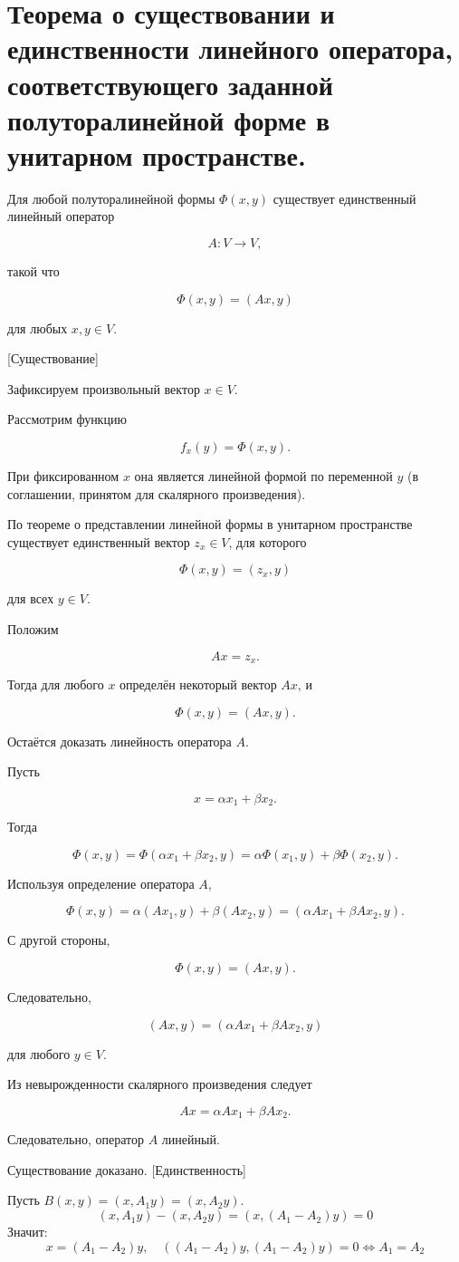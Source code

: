 \documentclass[14pt]{extreport}
\begin{document}
    \chapter{Теорема о существовании и единственности линейного оператора, соответствующего
заданной полуторалинейной форме в унитарном пространстве.}

\begin{thbox}
    Для любой полуторалинейной формы \(\Phi(x,y)\) существует единственный
линейный оператор

\[
A:V\to V,
\]

такой что

\[
\Phi(x,y)=(Ax,y)
\]

для любых \(x,y\in V\).
\end{thbox}
\begin{prbox}
    {[Существование]}

    Зафиксируем произвольный вектор \(x\in V\).

Рассмотрим функцию

\[
f_x(y)=\Phi(x,y).
\]

При фиксированном \(x\) она является линейной формой по переменной \(y\)
(в соглашении, принятом для скалярного произведения).

По теореме о представлении линейной формы в унитарном пространстве
существует единственный вектор \(z_x\in V\), для которого

\[
\Phi(x,y)=(z_x,y)
\]

для всех \(y\in V\).

Положим

\[
Ax=z_x.
\]

Тогда для любого \(x\) определён некоторый вектор \(Ax\), и

\[
\Phi(x,y)=(Ax,y).
\]

Остаётся доказать линейность оператора \(A\).

Пусть

\[
x=\alpha x_1+\beta x_2.
\]

Тогда

\[
\Phi(x,y)
=
\Phi(\alpha x_1+\beta x_2,y)
=
\alpha\Phi(x_1,y)+\beta\Phi(x_2,y).
\]

Используя определение оператора \(A\),

\[
\Phi(x,y)
=
\alpha(Ax_1,y)+\beta(Ax_2,y)
=
(\alpha Ax_1+\beta Ax_2,y).
\]

С другой стороны,

\[
\Phi(x,y)=(Ax,y).
\]

Следовательно,

\[
(Ax,y)
=
(\alpha Ax_1+\beta Ax_2,y)
\]

для любого \(y\in V\).

Из невырожденности скалярного произведения следует

\[
Ax=\alpha Ax_1+\beta Ax_2.
\]

Следовательно, оператор \(A\) линейный.

Существование доказано.
\newpage
{[Единственность]}

Пусть $B(x,y) = (x,A_1y)=(x,A_2y)$.
$$
(x,A_1y)-(x,A_2y)=(x,(A_1-A_2)y)=0
$$
Значит:
$$
x=(A_1-A_2)y, \quad ((A_1-A_2)y,(A_1-A_2)y)=0\Leftrightarrow A_1=A_2
$$

\end{prbox}
\end{document}
